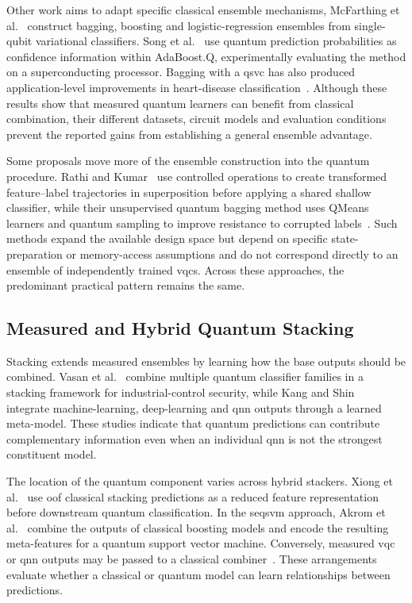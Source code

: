 \documentclass[]{UCD_CS_MSc_AAI_Report}
\begin{document}
Other work aims to adapt specific classical ensemble mechanisms, McFarthing et al.~\cite{mcfarthing_classical_2024} construct bagging, boosting and logistic-regression ensembles from single-qubit variational classifiers. Song et al.~\cite{song_quantum_2024} use quantum prediction probabilities as confidence information within AdaBoost.Q, experimentally evaluating the method on a superconducting processor. Bagging with a \ac{qsvc} has also produced application-level improvements in heart-disease classification~\cite{abdulsalam_explainable_2023}. Although these results show that measured quantum learners can benefit from classical combination, their different datasets, circuit models and evaluation conditions prevent the reported gains from establishing a general ensemble advantage.

Some proposals move more of the ensemble construction into the quantum procedure. Rathi and Kumar~\cite{rathi_enhanced_2025} use controlled operations to create transformed feature--label trajectories in superposition before applying a shared shallow classifier, while their unsupervised quantum bagging method uses QMeans learners and quantum sampling to improve resistance to corrupted labels~\cite{rathi_quantum_2025}. Such methods expand the available design space but depend on specific state-preparation or memory-access assumptions and do not correspond directly to an ensemble of independently trained \acp{vqc}. Across these approaches, the predominant practical pattern remains the same.

\subsection{Measured and Hybrid Quantum Stacking}
Stacking extends measured ensembles by learning how the base outputs should be combined. Vasan et al.~\cite{vasan_exploring_2025} combine multiple quantum classifier families in a stacking framework for industrial-control security, while Kang and Shin~\cite{kang_amino_2025} integrate machine-learning, deep-learning and \ac{qnn} outputs through a learned meta-model. These studies indicate that quantum predictions can contribute complementary information even when an individual \ac{qnn} is not the strongest constituent model.

The location of the quantum component varies across hybrid stackers. Xiong et al.~\cite{xiong_hybrid_2024} use \ac{oof} classical stacking predictions as a reduced feature representation before downstream quantum classification. In the \ac{seqsvm} approach, Akrom et al.~\cite{akrom_bloodbrain_2025} combine the outputs of classical boosting models and encode the resulting meta-features for a quantum support vector machine. Conversely, measured \ac{vqc} or \ac{qnn} outputs may be passed to a classical combiner~\cite{mcfarthing_classical_2024,vasan_exploring_2025}. These arrangements evaluate whether a classical or quantum model can learn relationships between predictions.
\end{document}
